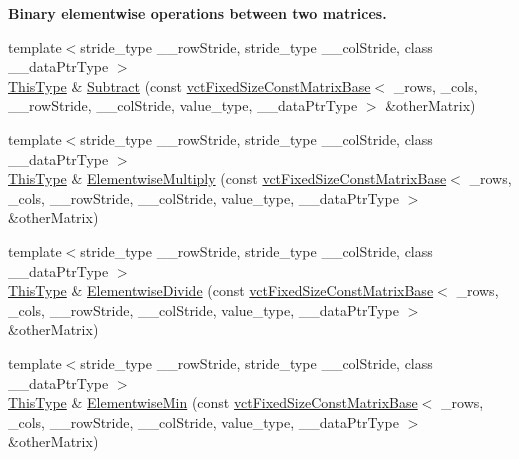 \begin{Indent}{\bf Binary elementwise operations between two matrices.}
\begin{DoxyCompactItemize}
\item 
{\footnotesize template$<$stride\+\_\+type \+\_\+\+\_\+row\+Stride, stride\+\_\+type \+\_\+\+\_\+col\+Stride, class \+\_\+\+\_\+data\+Ptr\+Type $>$ }\\\hyperlink{classvct_fixed_size_const_matrix_base_a7ec66a96ed7e08ce9ff54093133c9d8d}{This\+Type} \& \hyperlink{classvct_fixed_size_matrix_base_ad6fc2d101a0535ea5b0498792882eee4}{Subtract} (const \hyperlink{classvct_fixed_size_const_matrix_base}{vct\+Fixed\+Size\+Const\+Matrix\+Base}$<$ \+\_\+rows, \+\_\+cols, \+\_\+\+\_\+row\+Stride, \+\_\+\+\_\+col\+Stride, value\+\_\+type, \+\_\+\+\_\+data\+Ptr\+Type $>$ \&other\+Matrix)
\item 
{\footnotesize template$<$stride\+\_\+type \+\_\+\+\_\+row\+Stride, stride\+\_\+type \+\_\+\+\_\+col\+Stride, class \+\_\+\+\_\+data\+Ptr\+Type $>$ }\\\hyperlink{classvct_fixed_size_const_matrix_base_a7ec66a96ed7e08ce9ff54093133c9d8d}{This\+Type} \& \hyperlink{classvct_fixed_size_matrix_base_a4c5b8b57849c33c9b9dd4583381582bf}{Elementwise\+Multiply} (const \hyperlink{classvct_fixed_size_const_matrix_base}{vct\+Fixed\+Size\+Const\+Matrix\+Base}$<$ \+\_\+rows, \+\_\+cols, \+\_\+\+\_\+row\+Stride, \+\_\+\+\_\+col\+Stride, value\+\_\+type, \+\_\+\+\_\+data\+Ptr\+Type $>$ \&other\+Matrix)
\item 
{\footnotesize template$<$stride\+\_\+type \+\_\+\+\_\+row\+Stride, stride\+\_\+type \+\_\+\+\_\+col\+Stride, class \+\_\+\+\_\+data\+Ptr\+Type $>$ }\\\hyperlink{classvct_fixed_size_const_matrix_base_a7ec66a96ed7e08ce9ff54093133c9d8d}{This\+Type} \& \hyperlink{classvct_fixed_size_matrix_base_a96667acddd1fd252e198c16ee59ecf32}{Elementwise\+Divide} (const \hyperlink{classvct_fixed_size_const_matrix_base}{vct\+Fixed\+Size\+Const\+Matrix\+Base}$<$ \+\_\+rows, \+\_\+cols, \+\_\+\+\_\+row\+Stride, \+\_\+\+\_\+col\+Stride, value\+\_\+type, \+\_\+\+\_\+data\+Ptr\+Type $>$ \&other\+Matrix)
\item 
{\footnotesize template$<$stride\+\_\+type \+\_\+\+\_\+row\+Stride, stride\+\_\+type \+\_\+\+\_\+col\+Stride, class \+\_\+\+\_\+data\+Ptr\+Type $>$ }\\\hyperlink{classvct_fixed_size_const_matrix_base_a7ec66a96ed7e08ce9ff54093133c9d8d}{This\+Type} \& \hyperlink{classvct_fixed_size_matrix_base_ac44374de7e3e2bc54adc31d4ca40ccbe}{Elementwise\+Min} (const \hyperlink{classvct_fixed_size_const_matrix_base}{vct\+Fixed\+Size\+Const\+Matrix\+Base}$<$ \+\_\+rows, \+\_\+cols, \+\_\+\+\_\+row\+Stride, \+\_\+\+\_\+col\+Stride, value\+\_\+type, \+\_\+\+\_\+data\+Ptr\+Type $>$ \&other\+Matrix)

\end{DoxyCompactItemize}
\end{Indent}
